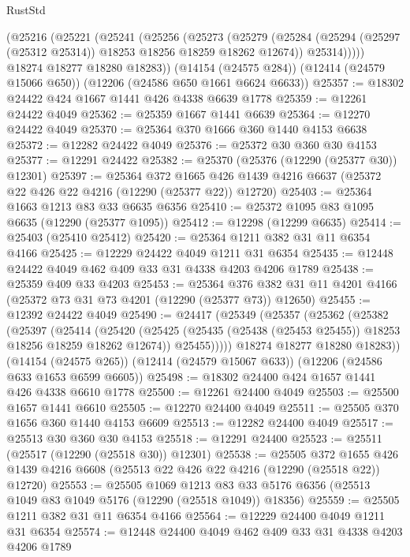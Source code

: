 \begin{lexlean}{RustStd}
\begin{coremodule}
      (@25216
        (@25221
          (@25241
            (@25256
              (@25273
                (@25279
                  (@25284 (@25294 (@25297 (@25312 @25314)) @18253 @18256 @18259 @18262 @12674))
                  @25314)))))
        @18274
        @18277
        @18280
        @18283))
    (@14154 (@24575 @284))
    (@12414 (@24579 @15066 @650))
    (@12206 (@24586 @650 @1661 @6624 @6633))
@25357 := @18302 @24422 @424 @1667 @1441 @426 @4338 @6639 @1778
@25359 := @12261 @24422 @4049
@25362 := @25359 @1667 @1441 @6639
@25364 := @12270 @24422 @4049
@25370 := @25364 @370 @1666 @360 @1440 @4153 @6638
@25372 := @12282 @24422 @4049
@25376 := @25372 @30 @360 @30 @4153
@25377 := @12291 @24422
@25382 := @25370 (@25376 (@12290 (@25377 @30)) @12301)
@25397 := @25364
    @372
    @1665
    @426
    @1439
    @4216
    @6637
    (@25372 @22 @426 @22 @4216 (@12290 (@25377 @22)) @12720)
@25403 := @25364 @1663 @1213 @83 @33 @6635 @6356
@25410 := @25372 @1095 @83 @1095 @6635 (@12290 (@25377 @1095))
@25412 := @12298 (@12299 @6635)
@25414 := @25403 (@25410 @25412)
@25420 := @25364 @1211 @382 @31 @11 @6354 @4166
@25425 := @12229 @24422 @4049 @1211 @31 @6354
@25435 := @12448 @24422 @4049 @462 @409 @33 @31 @4338 @4203 @4206 @1789
@25438 := @25359 @409 @33 @4203
@25453 := @25364
    @376
    @382
    @31
    @11
    @4201
    @4166
    (@25372 @73 @31 @73 @4201 (@12290 (@25377 @73)) @12650)
@25455 := @12392 @24422 @4049
@25490 := @24417
    (@25349
      (@25357
        (@25362
          (@25382
            (@25397
              (@25414
                (@25420
                  (@25425 (@25435 (@25438 (@25453 @25455)) @18253 @18256 @18259 @18262 @12674))
                  @25455)))))
        @18274
        @18277
        @18280
        @18283))
    (@14154 (@24575 @265))
    (@12414 (@24579 @15067 @633))
    (@12206 (@24586 @633 @1653 @6599 @6605))
@25498 := @18302 @24400 @424 @1657 @1441 @426 @4338 @6610 @1778
@25500 := @12261 @24400 @4049
@25503 := @25500 @1657 @1441 @6610
@25505 := @12270 @24400 @4049
@25511 := @25505 @370 @1656 @360 @1440 @4153 @6609
@25513 := @12282 @24400 @4049
@25517 := @25513 @30 @360 @30 @4153
@25518 := @12291 @24400
@25523 := @25511 (@25517 (@12290 (@25518 @30)) @12301)
@25538 := @25505
    @372
    @1655
    @426
    @1439
    @4216
    @6608
    (@25513 @22 @426 @22 @4216 (@12290 (@25518 @22)) @12720)
@25553 := @25505
    @1069
    @1213
    @83
    @33
    @5176
    @6356
    (@25513 @1049 @83 @1049 @5176 (@12290 (@25518 @1049)) @18356)
@25559 := @25505 @1211 @382 @31 @11 @6354 @4166
@25564 := @12229 @24400 @4049 @1211 @31 @6354
@25574 := @12448 @24400 @4049 @462 @409 @33 @31 @4338 @4203 @4206 @1789

\end{coremodule}
\end{lexlean}
